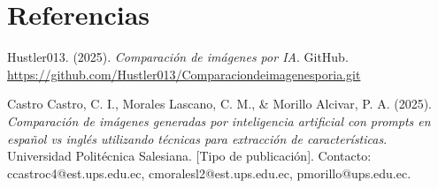 \documentclass[unnumsec,webpdf,modern,large]{mam-authoring-template}
\theoremstyle{thmstyleone}%
\theoremstyle{thmstyletwo}%
\theoremstyle{thmstylethree}%
\begin{document}
\section*{Referencias}

Hustler013. (2025). \textit{Comparación de imágenes por IA}. GitHub. \url{https://github.com/Hustler013/Comparaciondeimagenesporia.git}

Castro Castro, C. I., Morales Lascano, C. M., \& Morillo Alcivar, P. A. (2025). \textit{Comparación de imágenes generadas por inteligencia artificial con prompts en español vs inglés utilizando técnicas para extracción de características}. Universidad Politécnica Salesiana. [Tipo de publicación]. Contacto: ccastroc4@est.ups.edu.ec, cmoralesl2@est.ups.edu.ec, pmorillo@ups.edu.ec.

 
\end{document}
